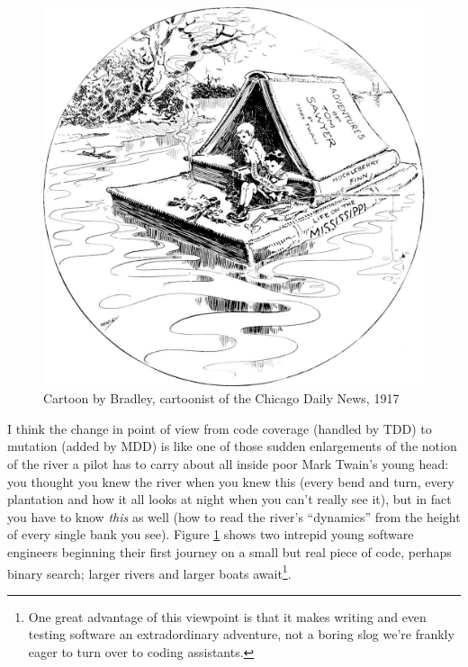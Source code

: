 \documentclass[sigplan,screen]{acmart}
\begin{document}
\begin{figure}
  \includegraphics[width=\columnwidth]{twain2.jpg}
  \caption{Cartoon by Bradley, cartoonist of the Chicago Daily News, 1917}
  \label{fig:twain}
  \end{figure}

I think the change in point of view from code coverage (handled by
TDD) to mutation (added by MDD) is like one of those sudden
enlargements of the notion of the river a pilot has to carry about all
inside poor Mark Twain's young head:  you thought you knew the river
when you knew this (every bend and turn, every plantation and how it
all looks at night when you can't really see it), but in fact you have
to know \emph{this} as well (how to read the river's ``dynamics'' from
the height of every single bank you see).  Figure \ref{fig:twain}
shows two intrepid young software engineers beginning their
first journey on a small but real piece of code, perhaps binary search; larger
rivers and larger boats await\footnote{One great advantage of this
  viewpoint is that it makes writing and even testing software an
  extradordinary adventure, not a boring slog we're frankly eager to
  turn over to coding assistants.}.
\end{document}
